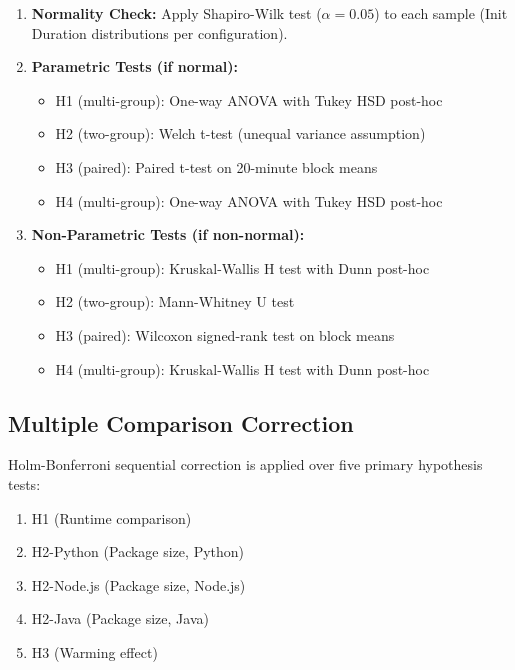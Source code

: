 \begin{enumerate}
    \item \textbf{Normality Check:} Apply Shapiro-Wilk test ($\alpha = 0.05$) to each sample (Init Duration distributions per configuration).
    
    \item \textbf{Parametric Tests (if normal):}
    \begin{itemize}
        \item H1 (multi-group): One-way ANOVA with Tukey HSD post-hoc
        \item H2 (two-group): Welch t-test (unequal variance assumption)
        \item H3 (paired): Paired t-test on 20-minute block means
        \item H4 (multi-group): One-way ANOVA with Tukey HSD post-hoc
    \end{itemize}
    
    \item \textbf{Non-Parametric Tests (if non-normal):}
    \begin{itemize}
        \item H1 (multi-group): Kruskal-Wallis H test with Dunn post-hoc
        \item H2 (two-group): Mann-Whitney U test
        \item H3 (paired): Wilcoxon signed-rank test on block means
        \item H4 (multi-group): Kruskal-Wallis H test with Dunn post-hoc
    \end{itemize}
\end{enumerate}


\subsection{Multiple Comparison Correction}

Holm-Bonferroni sequential correction is applied over five primary hypothesis tests:

\begin{enumerate}
    \item H1 (Runtime comparison)
    \item H2-Python (Package size, Python)
    \item H2-Node.js (Package size, Node.js)
    \item H2-Java (Package size, Java)
    \item H3 (Warming effect)
\end{enumerate}

